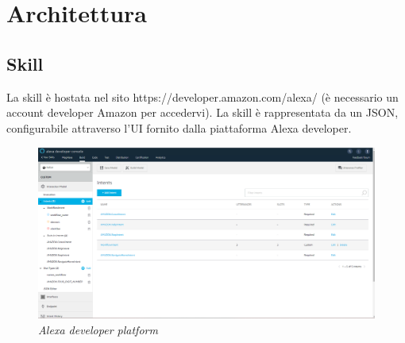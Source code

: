 \chapter{Architettura}
\section{Skill}\label{architetturaSkill}
La skill è hostata nel sito https://developer.amazon.com/alexa/ (è necessario un account developer Amazon per accedervi). La skill è rappresentata da un JSON, configurabile attraverso l'UI fornito dalla piattaforma Alexa developer.
\begin{figure} [h]
    \centering
	\includegraphics[scale=0.2]{./images/SkillPage.PNG}
	\caption{\textit{Alexa developer platform}}\label{classlambda}
\end{figure}


